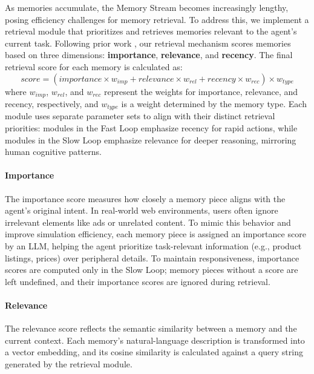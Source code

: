 \documentclass[manuscript,review,anonymous]{acmart}
\begin{document}
As memories accumulate, the Memory Stream becomes increasingly lengthy, posing efficiency challenges for memory retrieval.
To address this, we implement a retrieval module that prioritizes and retrieves memories relevant to the agent's current task.
Following prior work \cite{parkGenerativeAgentsInteractive2023}, our retrieval mechanism scores memories based on three dimensions: \textbf{importance}, \textbf{relevance}, and \textbf{recency}. The final retrieval score for each memory is calculated as:
\[
score = (importance \times w_{imp} + relevance \times w_{rel} + recency \times w_{rec}) \times w_{type}
\]
where $w_{imp}$, $w_{rel}$, and $w_{rec}$ represent the weights for importance, relevance, and recency, respectively, and $w_{type}$ is a weight determined by the memory type.
Each module uses separate parameter sets to align with their distinct retrieval priorities: modules in the Fast Loop emphasize recency for rapid actions, while modules in the Slow Loop emphasize relevance for deeper reasoning, mirroring human cognitive patterns.


\paragraph{Importance}
\label{sec:importance}


The importance score measures how closely a memory piece aligns with the agent's original intent. In real-world web environments, users often ignore irrelevant elements like ads or unrelated content. To mimic this behavior and improve simulation efficiency, each memory piece is assigned an importance score by an LLM, helping the agent prioritize task-relevant information (e.g., product listings, prices) over peripheral details. To maintain responsiveness, importance scores are computed only in the Slow Loop; memory pieces without a score are left undefined, and their importance scores are ignored during retrieval.

\paragraph{Relevance}
The relevance score reflects the semantic similarity between a memory and the current context. Each memory's natural-language description is transformed into a vector embedding, and its cosine similarity is calculated against a query string generated by the retrieval module.
\end{document}
